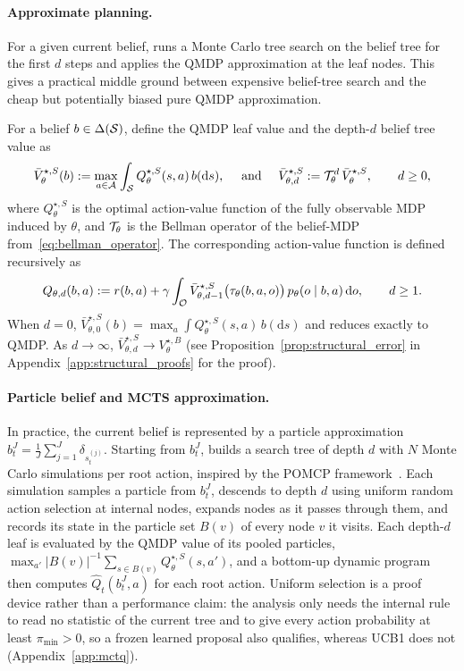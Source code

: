 \paragraph{Approximate planning.} For a given current belief,  runs a Monte Carlo tree search on the belief tree for the first $d$ steps and applies the QMDP approximation at the leaf nodes. This gives a practical middle ground between expensive belief-tree search and the cheap but potentially biased pure QMDP approximation. 


For a belief $b\in\Delta({\mathcal{S}})$, define the QMDP leaf value and the depth-$d$ belief tree value as 
\begin{equation}
\bar V_{\theta}^{\star,S}(b)
:=
\max_{a\in{\mathcal{A}}}\int_{{\mathcal{S}}} Q_{\theta}^{\star,S}(s,a)\, b(\mathrm ds), \quad \text{ and } \quad \bar V_{\theta,d}^{\star,S}:={\mathcal{T}}_\theta^d\, \bar V_{\theta}^{\star,S}, \qquad d\ge 0,
\label{eq:U0_def}
\end{equation}
where $Q_{\theta}^{\star,S}$ is the optimal action-value function of the fully observable MDP induced by $\theta$, and ${\mathcal{T}}_\theta$ is the Bellman operator of the belief-MDP from~\eqref{eq:bellman_operator}. The corresponding action-value function is defined recursively as
\begin{equation}
Q_{\theta,d}(b,a) := r(b,a)+\gamma \int_{{\mathcal{O}}} \bar V_{\theta,d-1}^{\star,S}\bigl(\tau_\theta(b,a,o)\bigr)\, p_\theta(o\mid b,a)\, \mathrm do, \qquad d\ge 1.
\label{eq:Qd_def}
\end{equation}
When $d=0$, $\bar V_{\theta,0}^{\star,S}(b)=\max_a\int Q_\theta^{\star,S}(s,a)\,b(\mathrm ds)$ and  reduces exactly to QMDP. As $d\to\infty$, $\bar V_{\theta,d}^{\star,S}\to V_\theta^{\star,B}$ (see Proposition~\ref{prop:structural_error} in Appendix~\ref{app:structural_proofs} for the proof).

\paragraph{Particle belief and MCTS approximation.}
In practice, the current belief is represented by a particle approximation $b_t^J=\frac{1}{J}\sum_{j=1}^J \delta_{s_t^{(j)}}$.
Starting from $b^J_t$,  builds a search tree of depth $d$ with $N$ Monte Carlo simulations per root action, inspired by the POMCP framework~\citep{silver2010monte}.
Each simulation samples a particle from $b_t^J$, descends to depth $d$ using uniform random action selection at internal nodes, expands nodes as it passes through them, and records its state in the particle set $B(v)$ of every node $v$ it visits.
Each depth-$d$ leaf is evaluated by the QMDP value of its pooled particles, $\max_{a'}|B(v)|^{-1}\sum_{s\in B(v)}Q_\theta^{\star,S}(s,a')$, and a bottom-up dynamic program then computes $\widehat Q_t(b_t^J,a)$ for each root action.
Uniform selection is a proof device rather than a performance claim: the analysis only needs the internal rule to read no statistic of the current tree and to give every action probability at least $\pi_{\min}>0$, so a frozen learned proposal also qualifies, whereas UCB1 does not (Appendix~\ref{app:mctq}).

